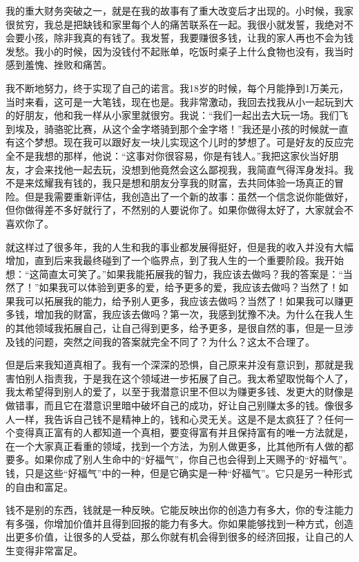我的重大财务突破之一，就是在我的故事有了重大改变后才出现的。小时候，我家很贫穷，我总是把缺钱和家里每个人的痛苦联系在一起。我很小就发誓，我绝对不会要小孩，除非我真的有钱了。我发誓，我要赚很多钱，让我的家人再也不会为钱发愁。我小的时候，因为没钱付不起账单，吃饭时桌子上什么食物也没有，我当时感到羞愧、挫败和痛苦。

我不断地努力，终于实现了自己的诺言。我18岁的时候，每个月能挣到1万美元，当时来看，这可是一大笔钱，现在也是。我非常激动，我回去找我从小一起玩到大的好朋友，他和我一样从小家里就很穷。我说：“我们一起出去大玩一场。我们飞到埃及，骑骆驼比赛，从这个金字塔骑到那个金字塔！”我还是小孩的时候就一直有这个梦想。现在我可以跟好友一块儿实现这个儿时的梦想了。可是好友的反应完全不是我想的那样，他说：“这事对你很容易，你是有钱人。”我把这家伙当好朋友，才会来找他一起去玩，没想到他竟然会这么鄙视我，我简直气得浑身发抖。我不是来炫耀我有钱的，我只是想和朋友分享我的财富，去共同体验一场真正的冒险。但是我需要重新评估，我创造出了一个新的故事：虽然一个信念说你能做好，但你做得差不多好就行了，不然别的人要说你了。如果你做得太好了，大家就会不喜欢你了。

就这样过了很多年，我的人生和我的事业都发展得挺好，但是我的收入并没有大幅增加，直到后来我最终碰到了一个临界点，到了我人生的一个重要阶段。我开始想：“这简直太可笑了。”如果我能拓展我的智力，我应该去做吗？我的答案是：“当然了！”如果我可以体验到更多的爱，给予更多的爱，我应该去做吗？当然了！如果我可以拓展我的能力，给予别人更多，我应该去做吗？当然了！如果我可以赚更多钱，增加我的财富，我应该去做吗？第一次，我感到犹豫不决。为什么在我人生的其他领域我拓展自己，让自己得到更多，给予更多，是很自然的事，但是一旦涉及钱的问题，突然之间我的答案就完全不同了？为什么？这太不合理了。

但是后来我知道真相了。我有一个深深的恐惧，自己原来并没有意识到，那就是我害怕别人指责我，于是我在这个领域进一步拓展了自己。我太希望取悦每个人了，我太希望得到别人的爱了，以至于我潜意识里不但以为赚更多钱、发更大的财像是做错事，而且它在潜意识里暗中破坏自己的成功，好让自己别赚太多的钱。像很多人一样，我告诉自己钱不是精神上的，钱和心灵无关。这是不是太疯狂了？任何一个变得真正富有的人都知道一个真相，要变得富有并且保持富有的唯一方法就是，在一个大家真正看重的领域，找到一个方法，为别人做更多，比其他所有人做的都要多。如果你成了别人生命中的“好福气”，你自己也会得到上天赐予的“好福气”。钱，只是这些“好福气”中的一种，但是它确实是一种“好福气”。它只是另一种形式的自由和富足。

钱不是别的东西，钱就是一种反映。它能反映出你的创造力有多大，你的专注能力有多强，你增加价值并且得到回报的能力有多大。你如果能够找到一种方式，创造出更多价值，让很多的人受益，那么你就有机会得到很多的经济回报，让自己的人生变得非常富足。

